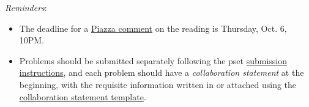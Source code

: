 \documentclass[handout]{mcs}
\begin{document}
\renewcommand{\reading}
{
\emph{For this pset}: Section~\bref{state_machine_sec}{ on State Machines}, 
Chapter~\bref{recursive_data_chap}{ on Recursive Data}, and 
Sections~\bref{divisibility_sec}{--}~\bref{fundamental_theorem_sec}{ on Number 
Theory.}

\emph{For lecture, Friday, Oct. 7}:
Section~\bref{Turing_sec}{--}~\bref{mod_prime_sec}{ on Modular Arithmetic.}
}



  \emph{Reminders}:
\begin{itemize}
\item The deadline for a
  \href{http://courses.csail.mit.edu/6.042/fall11/courseinfo#comments}{Piazza
    comment} on the reading is Thursday, Oct. 6, 10PM.
\item Problems should be submitted separately following the pset
  \href{http://courses.csail.mit.edu/6.042/fall11/submission}{submission
    instructions}, and each problem should have a \emph{collaboration
    statement} at the beginning, with the requisite information
  written in or attached using the
  \href{http://courses.csail.mit.edu/6.042/fall11/submission_template.pdf}{collaboration
    statement template}.

 \end{itemize}






\iffalse
NOT THIS WEEK


\pinput{PS_calculating_inverses}

\large\textbf{Repo: PS\_congruent\_modulo\_1000}
\pinput{PS_congruent_modulo_1000}

\large\textbf{Repo: PS\_RSA\_correctness}
\pinput{PS_RSA_correctness}
\fi






\end{document}
